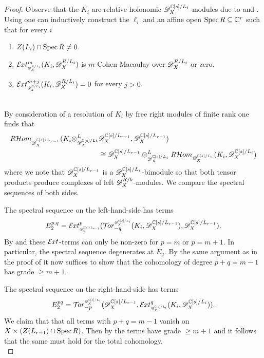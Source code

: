 \begin{proof}
    Observe that the $K_i$ are relative holonomic $\mathscr{D}_X^{\mathbb{C}[s]/L_i}$-modules due to  and .
    Using  one can inductively construct the $\ell_i$ and an affine open $\operatorname{Spec} R\subseteq \mathbb{C}^r$ such that for every $i$
    \begin{enumerate}[label=(\roman*)]
      \item $Z(L_i)\cap \operatorname{Spec} R \neq 0$.
      \item $\Ex{\D_X^{R/L_i}}{m}(K_i,\D_X^{R/L_i})$ is $m$-Cohen-Macaulay over $\mathscr{D}_X^{R/L_i}$ or zero.
      \item $\Ex{\D_X^{R/L_i}}{m+j}(K_i,\D_X^{R/L_i}) = 0$ for every $j>0$.
    \end{enumerate}
    \ \\

    By consideration of a resolution of $K_i$ by free right modules of finite rank one finds that
  \begin{align*}
    R \mathcal{H}om_{\mathscr{D}_X^{ \mathbb{C}[s]/L_{r-1} }}(K_i\otimes_{ \mathscr{D}_X^{\mathbb{C}[s]/L{i}}  }^L& \mathscr{D}_X^{\mathbb{C}[s]/L_{r-1} },\mathscr{D}_X^{ \mathbb{C}[s]/L_{r-1}} ) \\ &\cong  \mathscr{D}_X^{\mathbb{C}[s]/L_{r-1}}\otimes_{ \mathscr{D}_X^{\mathbb{C}[s]/L_i} }^L R \mathcal{H}om_{ \mathscr{D}_X^{\mathbb{C}[s]/L_{i}} } (K_i,\mathscr{D}_X^{\mathbb{C}[s]/L_{i}})
  \end{align*}
  where we note that $\mathscr{D}_X^{\mathbb{C}[s]/L_{r-1}}$ is a $\mathscr{D}_X^{\mathbb{C}[s]/L_{i}}$-bimodule so that both tensor products produce complexes of left $\mathscr{D}_X^{R/b}$-modules.
  We compare the spectral sequences of both sides.

  The spectral sequence on the left-hand-side has terms
  $$E^{p,q}_2 = \Ex{\D_X^{\C[s]/L_{r-1}}}{p}(\Tr{\D_X^{\C[s]/L_{i}} }{-q}(K_i,\D_X^{\C[s]/L_{r-1}}),\D_X^{\C[s]/L_{r-1}}).$$
  By  and  these $\mathcal{E}\mkern -1mu xt$-terms can only be non-zero for $p=m$ or $p = m+1$.
  In particular, the spectral sequence degenerates at $E_2$.
  By the same argument as in the proof of  it now suffices to show that the cohomology of degree $p + q = m-1$ has grade $\geq m+1$.

  The spectral sequence on the right-hand-side has terms
  $$E_2^{pq} = \Tr{\D_X^{\C[s]/L_{i}} }{-p}( \D_X^{\C[s]/L_{r-1}},\Ex{ \D_X^{\C[s]/L_{i}} }{q} (K_i,\D_X^{\C[s]/L_{i}})).$$
  We claim that that all terms with $p+q = m -1$ vanish on $X\times(Z(L_{r-1})\cap\operatorname{Spec} R)$.
  Then by  the terms have grade $\geq m+1$ and it follows that the same must hold for the total cohomology.
  \\


\end{proof}
